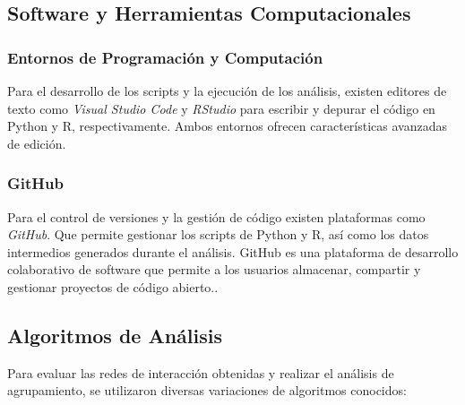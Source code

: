 \subsection{Software y Herramientas Computacionales}

\subsubsection{Entornos de Programación y Computación}
Para el desarrollo de los scripts y la ejecución de los análisis, existen editores de texto como \textit{Visual Studio Code} y \textit{RStudio} para escribir y depurar el código en Python y R, respectivamente. Ambos entornos ofrecen características avanzadas de edición.

\subsubsection{GitHub}
Para el control de versiones y la gestión de código  existen plataformas como \textit{GitHub}. Que permite gestionar los scripts de Python y R, así como los datos intermedios generados durante el análisis. GitHub es una plataforma de desarrollo colaborativo de software que permite a los usuarios almacenar, compartir y gestionar proyectos de código abierto.\cite{dozmorov2018}. 


\subsection{Algoritmos de Análisis}

Para evaluar las redes de interacción obtenidas y realizar el análisis de agrupamiento, se utilizaron diversas variaciones de algoritmos conocidos:
\\

